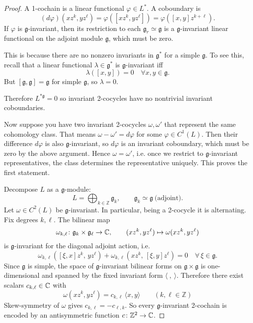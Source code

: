 \documentclass[12pt]{article}
\begin{document}
\begin{proof}
    A 1-cochain is a linear functional $\varphi \in L^*$. A coboundary is
    \[
        (d\varphi)(x z^k, y z^\ell) = \varphi([x z^k, y z^\ell]) = \varphi([x,y]z^{k+\ell}).
    \]
    If $\varphi$ is $\mathfrak{g}$-invariant, then its restriction to each $\mathfrak{g}_{r} \simeq \mathfrak{g}$ is a $\mathfrak{g}$-invariant linear functional on the adjoint module $\mathfrak{g}$, which must be zero.

    This is because there are no nonzero invariants in $\mathfrak{g}^*$ for a simple $\mathfrak{g}$. To see this, recall that a linear functional $\lambda \in \mathfrak{g}^*$ is $\mathfrak{g}$-invariant iff
    \[\lambda([x,y]) = 0 \quad \forall x,y \in \mathfrak{g}.\]
    But $[\mathfrak{g},\mathfrak{g}] = \mathfrak{g}$ for simple $\mathfrak{g}$, so $\lambda = 0$.

    Therefore $L^{*\mathfrak{g}} = 0$ so invariant 2-cocycles have no nontrivial invariant coboundaries.

    Now suppose you have two invariant 2-cocycles $\omega,\omega'$ that represent the same cohomology class. That means $\omega - \omega' = d\varphi$ for some $\varphi \in C^1(L)$. Then their difference $d\varphi$ is also $\mathfrak g$-invariant, so $d\varphi$ is an invariant coboundary, which must be zero by the above argument. Hence $\omega = \omega'$, i.e. once we restrict to $\mathfrak{g}$-invariant representatives, the class determines the representative uniquely. This proves the first statement.

    Decompose $L$ as a $\mathfrak g$-module:
    \[
        L=\bigoplus_{k\in\mathbb Z}\mathfrak g_k,
        \qquad \mathfrak g_k\simeq \mathfrak g \ \text{(adjoint)}.
    \]
    Let $\omega\in C^2(L)$ be $\mathfrak g$-invariant. In particular, being a 2-cocycle it is alternating. Fix degrees $k,\ell$. The bilinear map
    \[
        \omega_{k,\ell}\colon \mathfrak g_k\times \mathfrak g_\ell\to\Bbb C,\qquad
        (x z^k, y z^\ell)\mapsto \omega(x z^k, y z^\ell)
    \]
    is $\mathfrak g$-invariant for the diagonal adjoint action, i.e.
    \[
        \omega_{k,\ell}([\xi,x]z^k,\,y z^\ell)+\omega_{k,\ell}(x z^k,\,[\xi,y]z^\ell)=0
        \quad \forall\,\xi\in\mathfrak g.
    \]
    Since $\mathfrak g$ is simple, the space of $\mathfrak g$-invariant bilinear forms on $\mathfrak g\times\mathfrak g$ is one-dimensional and spanned by the fixed invariant form $\langle\ ,\ \rangle$. Therefore there exist scalars $c_{k,\ell}\in\Bbb C$ with \[\omega(x z^k, y z^\ell)=c_{k,\ell}\,\langle x,y\rangle\qquad(k,\ell\in\mathbb{Z})\] Skew-symmetry of $\omega$ gives $c_{k,\ell}=-c_{\ell,k}$. So every $\mathfrak g$-invariant 2-cochain is encoded by an antisymmetric function
    $c\colon \mathbb Z^2\to\Bbb C$.
\end{proof}
\end{document}

